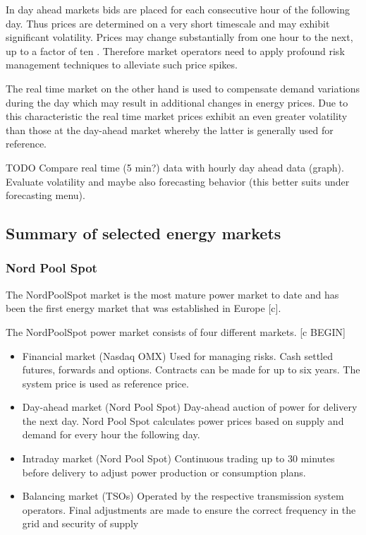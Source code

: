 In day ahead markets bids are placed for each consecutive hour of the following day. Thus prices are determined on a very short timescale and may exhibit significant volatility. Prices may change substantially from one hour to the next, up to a factor of ten \cite{huisman2007hourly}. Therefore market operators need to apply profound risk management techniques to alleviate such price spikes. 

The real time market on the other hand is used to compensate demand variations during the day which may result in additional changes in energy prices. 
Due to this characteristic the real time market prices exhibit an even greater volatility than those at the day-ahead market whereby the latter is generally used for reference. 

TODO Compare real time (5 min?) data with hourly day ahead data (graph). Evaluate volatility and maybe also forecasting behavior (this better suits under forecasting menu). 


\subsection{Summary of selected energy markets}



\subsubsection{Nord Pool Spot}


The NordPoolSpot market is the most mature power market to date and has been the first energy market that was established in Europe [c]. 

The NordPoolSpot power market consists of four different markets. [c BEGIN]

\begin{itemize}[-]

\item Financial market (Nasdaq OMX)
Used for managing risks. Cash settled futures,
forwards and options. Contracts can be made for
up to six years. The system price is used as
reference price.

\item Day-ahead market (Nord Pool Spot)
Day-ahead auction of power for delivery the next
day. Nord Pool Spot calculates power prices
based on supply and demand for every hour the
following day.

\item Intraday market (Nord Pool Spot)
Continuous trading up to 30 minutes before
delivery to adjust power production or
consumption plans.

\item Balancing market (TSOs)
Operated by the respective transmission system
operators. Final adjustments are made to ensure
the correct frequency in the grid and security of
supply

\end{itemize}

